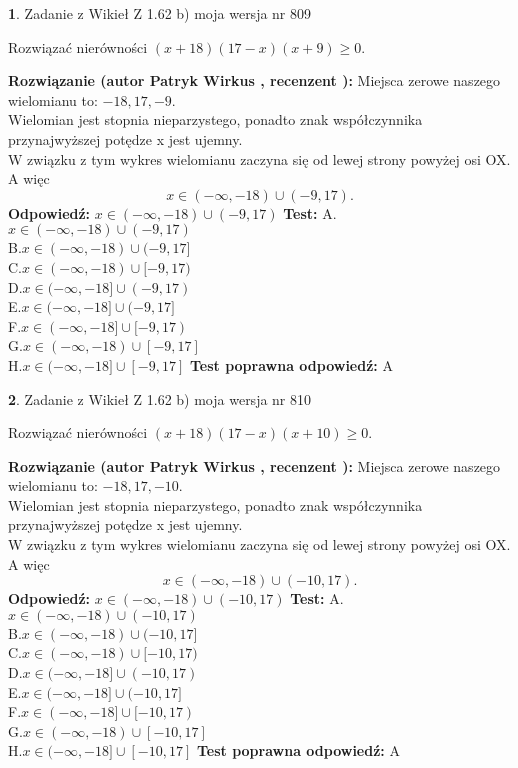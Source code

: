 \documentclass[12pt, a4paper]{article}
\theoremstyle{definition} %
\newtheorem{zad}{}
\newcommand{\zadStart}[1]{\begin{zad}#1\newline}
\newcommand{\zadStop}{\end{zad}}
\newcommand{\rozwStart}[2]{\noindent \textbf{Rozwiązanie (autor #1 , recenzent #2): }\newline}
\newcommand{\rozwStop}{\newline}
\newcommand{\odpStart}{\noindent \textbf{Odpowiedź:}\newline}
\newcommand{\odpStop}{\newline}
\newcommand{\testStart}{\noindent \textbf{Test:}\newline}
\newcommand{\testStop}{\newline}
\newcommand{\kluczStart}{\noindent \textbf{Test poprawna odpowiedź:}\newline}
\newcommand{\kluczStop}{\newline}
\begin{document}
\zadStart{Zadanie z Wikieł Z 1.62 b) moja wersja nr 809}

Rozwiązać nierówności $(x+18)(17-x)(x+9)\ge0$.
\zadStop
\rozwStart{Patryk Wirkus}{}
Miejsca zerowe naszego wielomianu to: $-18, 17, -9$.\\
Wielomian jest stopnia nieparzystego, ponadto znak współczynnika przy\linebreak najwyższej potędze x jest ujemny.\\ W związku z tym wykres wielomianu zaczyna się od lewej strony powyżej osi OX. A więc $$x \in (-\infty,-18) \cup (-9,17).$$
\rozwStop
\odpStart
$x \in (-\infty,-18) \cup (-9,17)$
\odpStop
\testStart
A.$x \in (-\infty,-18) \cup (-9,17)$\\
B.$x \in (-\infty,-18) \cup (-9,17]$\\
C.$x \in (-\infty,-18) \cup [-9,17)$\\
D.$x \in (-\infty,-18] \cup (-9,17)$\\
E.$x \in (-\infty,-18] \cup (-9,17]$\\
F.$x \in (-\infty,-18] \cup [-9,17)$\\
G.$x \in (-\infty,-18) \cup [-9,17]$\\
H.$x \in (-\infty,-18] \cup [-9,17]$
\testStop
\kluczStart
A
\kluczStop



\zadStart{Zadanie z Wikieł Z 1.62 b) moja wersja nr 810}

Rozwiązać nierówności $(x+18)(17-x)(x+10)\ge0$.
\zadStop
\rozwStart{Patryk Wirkus}{}
Miejsca zerowe naszego wielomianu to: $-18, 17, -10$.\\
Wielomian jest stopnia nieparzystego, ponadto znak współczynnika przy\linebreak najwyższej potędze x jest ujemny.\\ W związku z tym wykres wielomianu zaczyna się od lewej strony powyżej osi OX. A więc $$x \in (-\infty,-18) \cup (-10,17).$$
\rozwStop
\odpStart
$x \in (-\infty,-18) \cup (-10,17)$
\odpStop
\testStart
A.$x \in (-\infty,-18) \cup (-10,17)$\\
B.$x \in (-\infty,-18) \cup (-10,17]$\\
C.$x \in (-\infty,-18) \cup [-10,17)$\\
D.$x \in (-\infty,-18] \cup (-10,17)$\\
E.$x \in (-\infty,-18] \cup (-10,17]$\\
F.$x \in (-\infty,-18] \cup [-10,17)$\\
G.$x \in (-\infty,-18) \cup [-10,17]$\\
H.$x \in (-\infty,-18] \cup [-10,17]$
\testStop
\kluczStart
A
\kluczStop
\end{document}

